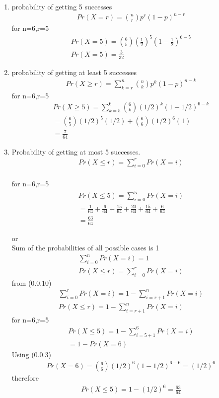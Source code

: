 \documentclass[journal,12pt,twocolumn]{IEEEtran}
\begin{document}
\begin{enumerate}
    \item probability of getting 5 successes
    \begin{align}
        Pr(X=r)= \binom{n}{r} p^{r}(1-p)^{n-r}
    \end{align}
    for n=6,r=5\\
    \begin{align}
        Pr(X=5)= \binom{6}{5} (\frac{1}{2})^{5}(1-\frac{1}{2})^{6-5}\\
        Pr(X=5)=\frac{3}{32}
    \end{align}
    \item probability of getting at least 5 successes
    \begin{align}
        Pr(X\geq r)=\sum ^{n}_{k=r} \binom{n}{k} p^k (1-p)^{n-k}
    \end{align}
    for n=6,r=5
    \begin{align}
        Pr(X\geq5)=\sum^6_{k=5}\binom{6}{k} (1/2)^k (1-1/2)^{6-k}\\
        =\binom{6}{5}(1/2)^5 (1/2) + \binom{6}{6}(1/2)^6 (1)\\
        =\frac{7}{64}
    \end{align}
    \item Probability of getting at most 5 successes.\\
    \begin{align}
         Pr(X\leq r)=\sum^{r}_{i=0}Pr(X=i)
    \end{align}\\
    for n=6,r=5
    \begin{align}
        Pr(X\leq 5)=\sum^{5}_{i=0}Pr(X=i)\\
        =\frac{1}{64}+\frac{6}{64}+\frac{15}{64}+\frac{20}{64}+\frac{15}{64}+\frac{6}{64}\\
        =\frac{63}{64}
    \end{align}
    
    or\\
       Sum of the probabilities of all possible cases is 1\\
    \begin{align}
        \sum^{n}_{i=0}Pr(X=i)=1\\
        Pr(X\leq r)=\sum^{r}_{i=0}Pr(X=i)
    \end{align}
        from (0.0.10)\\
    \begin{align}
        \sum^{r}_{i=0}Pr(X=i)=1-\sum^{n}_{i=r+1}Pr(X=i)\\
        Pr(X\leq r)=1-\sum^{n}_{i=r+1}Pr(X=i)
    \end{align}
    for n=6,r=5
    \begin{align}
        Pr(X\leq5)=1-\sum^{6}_{i=5+1}Pr(X=i)\\
        =1-Pr(X=6)
    \end{align}
    Using (0.0.3)
    \begin{align}
       Pr(X=6)=\binom{6}{6} (1/2)^{6}(1-1/2)^{6-6}=(1/2)^6
    \end{align}
    therefore
    \begin{align}
      Pr(X\leq5)=1-(1/2)^6=\frac{63}{64}
    \end{align}
\end{enumerate}
\end{document}
